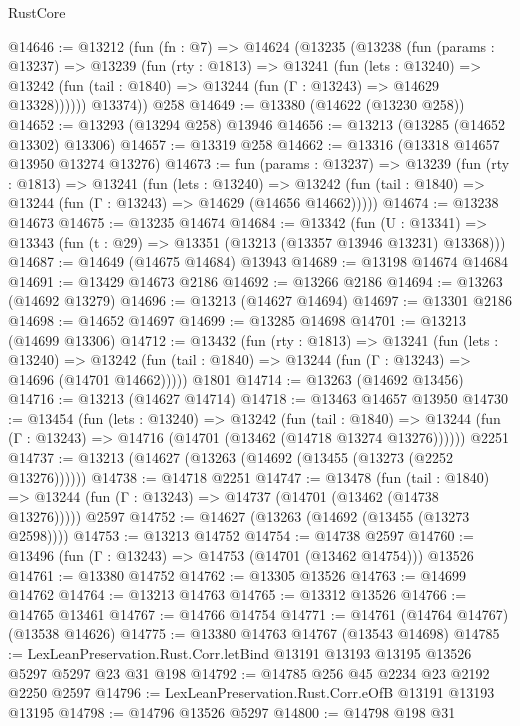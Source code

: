 \begin{lexlean}{RustCore}
\begin{coremodule}
@14646 := @13212
    (fun (fn : @7) =>
    @14624
      (@13235
        (@13238
          (fun (params : @13237) =>
          @13239
            (fun (rty : @1813) =>
            @13241
              (fun (lets : @13240) =>
              @13242 (fun (tail : @1840) => @13244 (fun (Γ : @13243) => @14629 @13328))))))
        @13374))
    @258
@14649 := @13380 (@14622 (@13230 @258))
@14652 := @13293 (@13294 @258) @13946
@14656 := @13213 (@13285 (@14652 @13302) @13306)
@14657 := @13319 @258
@14662 := @13316 (@13318 @14657 @13950 @13274 @13276)
@14673 := fun (params : @13237) =>
  @13239
    (fun (rty : @1813) =>
    @13241
      (fun (lets : @13240) =>
      @13242 (fun (tail : @1840) => @13244 (fun (Γ : @13243) => @14629 (@14656 @14662)))))
@14674 := @13238 @14673
@14675 := @13235 @14674
@14684 := @13342
    (fun (U : @13341) => @13343 (fun (t : @29) => @13351 (@13213 (@13357 @13946 @13231) @13368)))
@14687 := @14649 (@14675 @14684) @13943
@14689 := @13198 @14674 @14684
@14691 := @13429 @14673 @2186
@14692 := @13266 @2186
@14694 := @13263 (@14692 @13279)
@14696 := @13213 (@14627 @14694)
@14697 := @13301 @2186
@14698 := @14652 @14697
@14699 := @13285 @14698
@14701 := @13213 (@14699 @13306)
@14712 := @13432
    (fun (rty : @1813) =>
    @13241
      (fun (lets : @13240) =>
      @13242 (fun (tail : @1840) => @13244 (fun (Γ : @13243) => @14696 (@14701 @14662)))))
    @1801
@14714 := @13263 (@14692 @13456)
@14716 := @13213 (@14627 @14714)
@14718 := @13463 @14657 @13950
@14730 := @13454
    (fun (lets : @13240) =>
    @13242
      (fun (tail : @1840) =>
      @13244 (fun (Γ : @13243) => @14716 (@14701 (@13462 (@14718 @13274 @13276))))))
    @2251
@14737 := @13213 (@14627 (@13263 (@14692 (@13455 (@13273 (@2252 @13276))))))
@14738 := @14718 @2251
@14747 := @13478
    (fun (tail : @1840) => @13244 (fun (Γ : @13243) => @14737 (@14701 (@13462 (@14738 @13276)))))
    @2597
@14752 := @14627 (@13263 (@14692 (@13455 (@13273 @2598))))
@14753 := @13213 @14752
@14754 := @14738 @2597
@14760 := @13496 (fun (Γ : @13243) => @14753 (@14701 (@13462 @14754))) @13526
@14761 := @13380 @14752
@14762 := @13305 @13526
@14763 := @14699 @14762
@14764 := @13213 @14763
@14765 := @13312 @13526
@14766 := @14765 @13461
@14767 := @14766 @14754
@14771 := @14761 (@14764 @14767) (@13538 @14626)
@14775 := @13380 @14763 @14767 (@13543 @14698)
@14785 := LexLeanPreservation.Rust.Corr.letBind @13191 @13193 @13195 @13526 @5297 @5297 @23 @31 @198
@14792 := @14785 @256 @45 @2234 @23 @2192 @2250 @2597
@14796 := LexLeanPreservation.Rust.Corr.eOfB @13191 @13193 @13195
@14798 := @14796 @13526 @5297
@14800 := @14798 @198 @31

\end{coremodule}
\end{lexlean}
